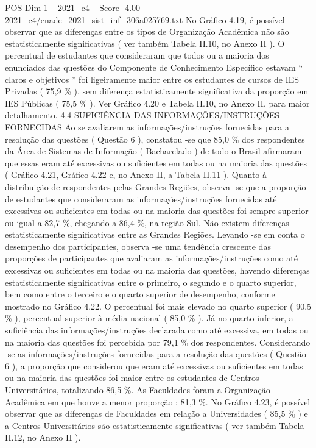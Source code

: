 \begin{textsample}{POS Dim 1 – 2021\_c4 – Score -4.00 – 2021\_c4/enade\_2021\_sist\_inf\_306a025769.txt}
No Gráfico 4.19, é possível observar que as diferenças entre os tipos de Organização Acadêmica não são estatisticamente significativas ( ver também Tabela II.10, no Anexo II ).
O percentual de estudantes que consideraram que todos ou a maioria dos enunciados das questões do Componente de Conhecimento Específico estavam “ claros e objetivos ” foi ligeiramente maior entre os estudantes de cursos de IES Privadas ( 75,9 \% ), sem diferença estatisticamente significativa da proporção em IES Públicas ( 75,5 \% ).
Ver Gráfico 4.20 e Tabela II.10, no Anexo II, para maior detalhamento. 4.4 SUFICIÊNCIA DAS INFORMAÇÕES/INSTRUÇÕES FORNECIDAS Ao se avaliarem as informações/instruções fornecidas para a resolução das questões ( Questão 6 ), constatou -se que 85,0 \% dos respondentes da Área de Sistemas de Informação ( Bacharelado ) de todo o Brasil afirmaram que essas eram até excessivas ou suficientes em todas ou na maioria das questões ( Gráfico 4.21, Gráfico 4.22 e, no Anexo II, a Tabela II.11 ).
Quanto à distribuição de respondentes pelas Grandes Regiões, observa -se que a proporção de estudantes que consideraram as informações/instruções fornecidas até excessivas ou suficientes em todas ou na maioria das questões foi sempre superior ou igual a 82,7 \%, chegando a 86,4 \%, na região Sul.
Não existem diferenças estatisticamente significativas entre as Grandes Regiões.
Levando -se em conta o desempenho dos participantes, observa -se uma tendência crescente das proporções de participantes que avaliaram as informações/instruções como até excessivas ou suficientes em todas ou na maioria das questões, havendo diferenças estatisticamente significativas entre o primeiro, o segundo e o quarto superior, bem como entre o terceiro e o quarto superior de desempenho, conforme mostrado no Gráfico 4.22.
O percentual foi mais elevado no quarto superior ( 90,5 \% ), percentual superior à média nacional ( 85,0 \% ).
Já no quarto inferior, a suficiência das informações/instruções declarada como até excessiva, em todas ou na maioria das questões foi percebida por 79,1 \% dos respondentes.
Considerando -se as informações/instruções fornecidas para a resolução das questões ( Questão 6 ), a proporção que considerou que eram até excessivas ou suficientes em todas ou na maioria das questões foi maior entre os estudantes de Centros Universitários, totalizando 86,5 \%.
As Faculdades foram a Organização Acadêmica em que houve a menor proporção : 81,3 \%.
No Gráfico 4.23, é possível observar que as diferenças de Faculdades em relação a Universidades ( 85,5 \% ) e a Centros Universitários são estatisticamente significativas ( ver também Tabela II.12, no Anexo II ).

\end{textsample}
